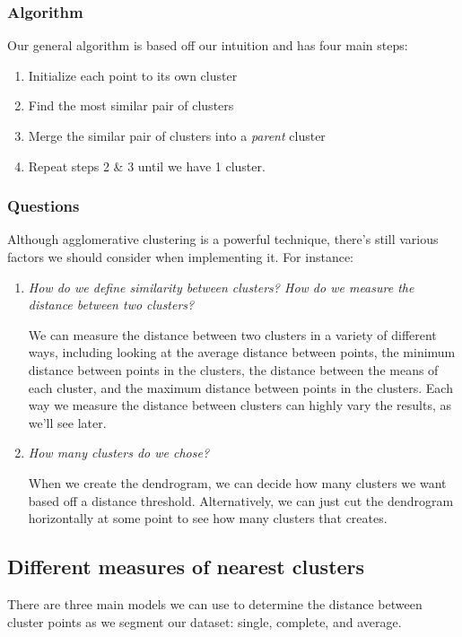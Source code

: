 \documentclass{article}
\begin{document}
\subsubsection{Algorithm}

Our general algorithm is based off our intuition and has four main steps:

\begin{enumerate}
	\item Initialize each point to its own cluster
	\item Find the most similar pair of clusters
	\item Merge the similar pair of clusters into a \textit{parent} cluster
	\item Repeat steps 2 \& 3 until we have 1 cluster.
\end{enumerate}

\subsubsection{Questions}

Although agglomerative clustering is a powerful technique, there's still various factors we should consider when implementing it. For instance:

\begin{enumerate}
	\item \textit{How do we define similarity between clusters? How do we measure the distance between two clusters?}
	
	We can measure the distance between two clusters in a variety of different ways, including looking at the average distance between points, the minimum distance between points in the clusters, the distance between the means of each cluster, and the maximum distance between points in the clusters. Each way we measure the distance between clusters can highly vary the results, as we'll see later.
	
	\item \textit{How many clusters do we chose?}
	
	When we create the dendrogram, we can decide how many clusters we want based off a distance threshold. Alternatively, we can just cut the dendrogram horizontally at some point to see how many clusters that creates.
	
\end{enumerate}

\subsection{Different measures of nearest clusters}
There are three main models we can use to determine the distance between cluster points as we segment our dataset: single, complete, and average.
\end{document}
